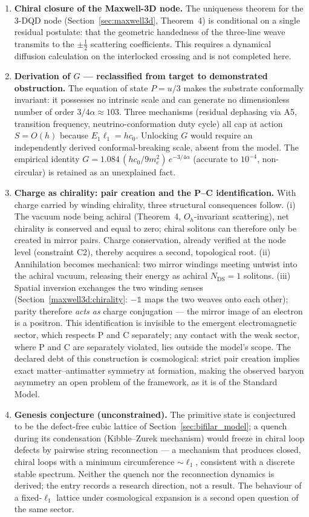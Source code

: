 \documentclass[11pt,a4paper]{article}
\theoremstyle{plain}
\theoremstyle{remark}
\newcommand{\Ncd}{\ensuremath{N_{\mathrm{DS}}}}
\begin{document}
\begin{enumerate}
    \item \textbf{Chiral closure of the Maxwell-3D node.} The uniqueness theorem for the 3-DQD node (Section~\ref{sec:maxwell3d}, Theorem~4) is conditional on a single residual postulate: that the geometric handedness of the three-line weave transmits to the $\pm\tfrac12$ scattering coefficients. This requires a dynamical diffusion calculation on the interlocked crossing and is not completed here.
    \item \textbf{Derivation of $G$ --- reclassified from target to demonstrated obstruction.} The equation of state $P = u/3$ makes the substrate conformally invariant: it possesses no intrinsic scale and can generate no dimensionless number of order $3/4\alpha \approx 103$. Three mechanisms (residual dephasing via A5, transition frequency, neutrino-conformation duty cycle) all cap at action $S = O(h)$ because $E_1\ell_1 = hc_0$. Unlocking $G$ would require an independently derived conformal-breaking scale, absent from the model. The empirical identity $G = 1.084\,(hc_0/9m_e^2)\,e^{-3/4\alpha}$ (accurate to $10^{-4}$, non-circular) is retained as an unexplained fact.

    \item \textbf{Charge as chirality: pair creation and the P--C identification.} With charge carried by winding chirality, three structural consequences follow. (i) The vacuum node being achiral (Theorem~4, $O_h$-invariant scattering), net chirality is conserved and equal to zero; chiral solitons can therefore only be created in mirror pairs. Charge conservation, already verified at the node level (constraint C2), thereby acquires a second, topological root. (ii) Annihilation becomes mechanical: two mirror windings meeting untwist into the achiral vacuum, releasing their energy as achiral $\Ncd = 1$ solitons. (iii) Spatial inversion exchanges the two winding senses (Section~\ref{maxwell3d:chirality}: $-\mathbb{1}$ maps the two weaves onto each other); parity therefore \emph{acts as} charge conjugation --- the mirror image of an electron is a positron. This identification is invisible to the emergent electromagnetic sector, which respects P and C separately; any contact with the weak sector, where P and C are separately violated, lies outside the model's scope. The declared debt of this construction is cosmological: strict pair creation implies exact matter--antimatter symmetry at formation, making the observed baryon asymmetry an open problem of the framework, as it is of the Standard Model.

    \item \textbf{Genesis conjecture (unconstrained).} The primitive state is conjectured to be the defect-free cubic lattice of Section~\ref{sec:bifilar_model}; a quench during its condensation (Kibble--Zurek mechanism) would freeze in chiral loop defects by pairwise string reconnection --- a mechanism that produces closed, chiral loops with a minimum circumference $\sim \ell_1$, consistent with a discrete stable spectrum. Neither the quench nor the reconnection dynamics is derived; the entry records a research direction, not a result. The behaviour of a fixed-$\ell_1$ lattice under cosmological expansion is a second open question of the same sector.


\end{enumerate}
\end{document}
